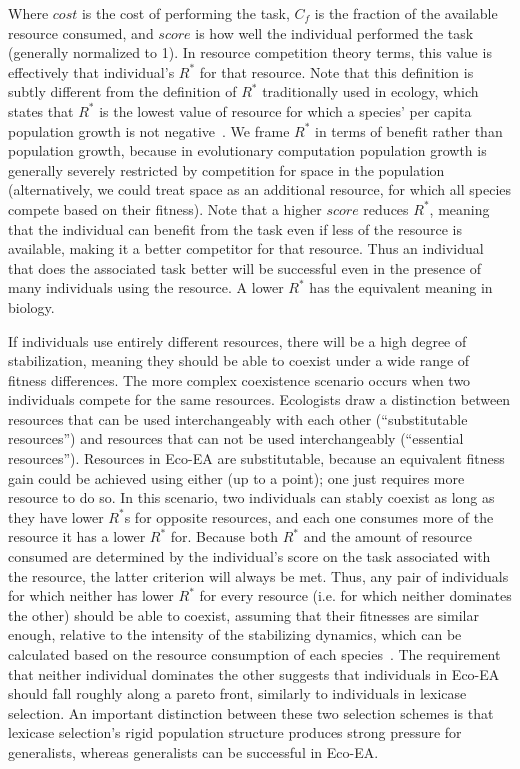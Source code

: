 Where $cost$ is the cost of performing the task, $C_f$ is the fraction of the available resource consumed, and $score$ is how well the individual performed the task (generally normalized to 1). In resource competition theory terms, this value is effectively that individual's $R^*$ for that resource. Note that this definition is subtly different from the definition of $R^*$ traditionally used in ecology, which states that $R^*$ is the lowest value of resource for which a species' per capita population growth is not negative~\cite{chase_ecological_2003}. We frame $R^*$ in terms of benefit rather than population growth, because in evolutionary computation population growth is generally severely restricted by competition for space in the population (alternatively, we could treat space as an additional resource, for which all species compete based on their fitness). Note that a higher $score$ reduces $R^*$, meaning that the individual can benefit from the task even if less of the resource is available, making it a better competitor for that resource. Thus an individual that does the associated task better will be successful even in the presence of many individuals using the resource. A lower $R^*$ has the equivalent meaning in biology.

If individuals use entirely different resources, there will be a high degree of stabilization, meaning they should be able to coexist under a wide range of fitness differences. The more complex coexistence scenario occurs when two individuals compete for the same resources. Ecologists draw a distinction between resources that can be used interchangeably with each other (``substitutable resources'') and resources that can not be used interchangeably (``essential resources''). Resources in Eco-EA are substitutable, because an equivalent fitness gain could be achieved using either (up to a point); one just requires more resource to do so.  In this scenario, two individuals can stably coexist as long as they have lower $R^*$s for opposite resources, and each one consumes more of the resource it has a lower $R^*$ for. Because both $R^*$ and the amount of resource consumed are determined by the individual's score on the task associated with the resource, the latter criterion will always be met. Thus, any pair of individuals for which neither has lower $R^*$ for every resource (i.e. for which neither dominates the other) should be able to coexist, assuming that their fitnesses are similar enough, relative to the intensity of the stabilizing dynamics, which can be calculated based on the resource consumption of each species~\cite{letten_linking_2017}. The requirement that neither individual dominates the other suggests that individuals in Eco-EA should fall roughly along a pareto front, similarly to individuals in lexicase selection. An important distinction between these two selection schemes is that lexicase selection's rigid population structure produces strong pressure for generalists, whereas generalists can be successful in Eco-EA.

